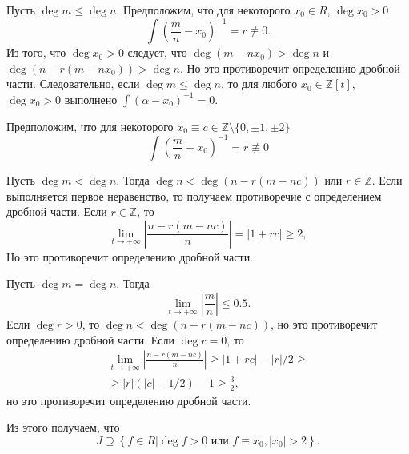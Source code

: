 \documentclass[_00_dissertation.tex]{subfiles}
\begin{document}
\begin{example}
    Пусть $\deg m \le \deg n$.
    Предположим, что для некоторого $x_0 \in R$, $\deg x_0 > 0$
    \begin{equation*}
        \int{\left(
            \frac{m}{n} - x_0
        \right)^{-1}} = r \not\equiv 0.
    \end{equation*}
    Из того, что $\deg x_0 > 0$ следует, что $\deg(m - n x_0) > \deg n$ и $\deg(n - r(m - n x_0)) > \deg n$.
    Но это противоречит определению дробной части.
    Следовательно, если $\deg m \le \deg n$, то для любого $x_0 \in \mathbb{Z}[t]$, $\deg x_0 > 0$ выполнено $\int{(\alpha - x_0)^{-1}} = 0$.
    
    Предположим, что для некоторого $x_0 \equiv c \in \mathbb{Z} \setminus \{0, \pm 1, \pm 2\}$
    \begin{equation*}
        \int{\left(
            \frac{m}{n} - x_0
        \right)^{-1}} = r \not\equiv 0
    \end{equation*}

    Пусть $\deg m < \deg n$.
    Тогда $\deg n < \deg(n - r(m - nc))$ или $r \in \mathbb{Z}$.
    Если выполняется первое неравенство, то получаем противоречие с определением дробной части.
    Если $r \in \mathbb{Z}$, то
    \begin{equation*}
        \lim_{t \to +\infty}\left|
            \frac{n - r(m - n c)}{n}
        \right| = |1 + r c| \ge 2,
    \end{equation*}
    Но это противоречит определению дробной части.

    Пусть $\deg m = \deg n$.
    Тогда
    \begin{equation*}
        \lim_{t \to +\infty}\left|
            \frac{m}{n}
        \right| \le 0.5.
    \end{equation*}
    Если $\deg r > 0$, то $\deg n < \deg(n - r(m - nc))$, но это противоречит определению дробной части.
    Если $\deg r = 0$, то
    \begin{align*}
        \lim_{t \to +\infty}\left|
            \frac{n - r(m - n c)}{n}
        \right| \ge |1 + rc| - |r|/2 \ge\\
        \ge |r|(|c| - 1/2) - 1 \ge \frac{3}{2},
    \end{align*}
    но это противоречит определению дробной части.

    Из этого получаем, что
    \begin{equation*}
        J \supseteq \left\{
            f \in R \big| \deg f > 0 \textrm{ или } f \equiv x_0, |x_0| > 2
        \right\}.
    \end{equation*}
    

\end{example}
\end{document}
